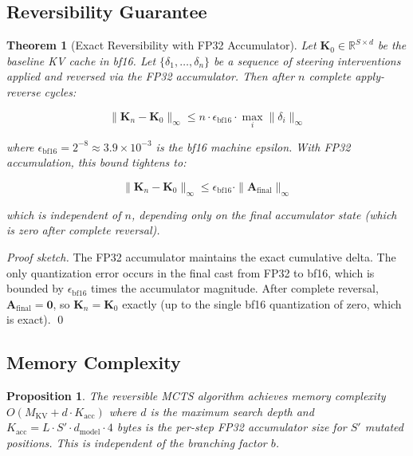 \documentclass[10pt]{article}
\newtheorem{theorem}{Theorem}
\newtheorem{proposition}{Proposition}
\begin{document}
\subsection{Reversibility Guarantee}

\begin{theorem}[Exact Reversibility with FP32 Accumulator]
Let $\mathbf{K}_0 \in \mathbb{R}^{S \times d}$ be the baseline KV cache in bf16. Let $\{\delta_1, \ldots, \delta_n\}$ be a sequence of steering interventions applied and reversed via the FP32 accumulator. Then after $n$ complete apply-reverse cycles:

\begin{equation}
\|\mathbf{K}_n - \mathbf{K}_0\|_\infty \leq n \cdot \epsilon_{\text{bf16}} \cdot \max_i \|\delta_i\|_\infty
\label{eq:reversibility_naive}
\end{equation}

where $\epsilon_{\text{bf16}} = 2^{-8} \approx 3.9 \times 10^{-3}$ is the bf16 machine epsilon. With FP32 accumulation, this bound tightens to:

\begin{equation}
\|\mathbf{K}_n - \mathbf{K}_0\|_\infty \leq \epsilon_{\text{bf16}} \cdot \|\mathbf{A}_{\text{final}}\|_\infty
\label{eq:reversibility_fp32}
\end{equation}

which is independent of $n$, depending only on the final accumulator state (which is zero after complete reversal).
\end{theorem}

\begin{proof}[Proof sketch]
The FP32 accumulator maintains the exact cumulative delta. The only quantization error occurs in the final cast from FP32 to bf16, which is bounded by $\epsilon_{\text{bf16}}$ times the accumulator magnitude. After complete reversal, $\mathbf{A}_{\text{final}} = \mathbf{0}$, so $\mathbf{K}_n = \mathbf{K}_0$ exactly (up to the single bf16 quantization of zero, which is exact). \qed
\end{proof}

\subsection{Memory Complexity}

\begin{proposition}
The reversible MCTS algorithm achieves memory complexity $O(M_{\text{KV}} + d \cdot K_{\text{acc}})$ where $d$ is the maximum search depth and $K_{\text{acc}} = L \cdot S' \cdot d_{\text{model}} \cdot 4$ bytes is the per-step FP32 accumulator size for $S'$ mutated positions. This is independent of the branching factor $b$.
\end{proposition}
\end{document}
